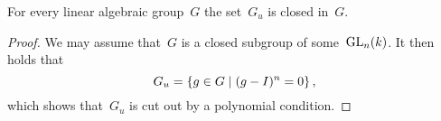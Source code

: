 \begin{lemma}
  For every linear algebraic group~$G$ the set~$G_u$ is closed in~$G$.
\end{lemma}


\begin{proof}
  We may assume that~$G$ is a closed subgroup of some~$\operatorname{GL}_n(k)$.
  It then holds that
  \[
      G_u
    = \{ g \in G \suchthat (g - I)^n = 0 \} \,,
  \]
  which shows that~$G_u$ is cut out by a polynomial condition.
\end{proof}






